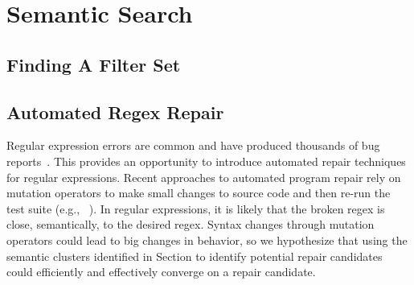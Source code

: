 \section{Semantic Search}

\subsection{Finding A Filter Set}

\subsection{Automated Regex Repair}
Regular expression errors are common and have produced thousands of bug reports~\cite{Spishak:2012:TSR:2318202.2318207}. This provides an opportunity to introduce automated repair techniques for regular expressions.
Recent approaches to automated program repair rely on mutation operators to make small changes to source code and then re-run the test suite (e.g., ~\cite{cacm10, genprog-tse-journal}). In regular expressions, it is likely that the broken regex is close, semantically, to the desired regex. Syntax changes through mutation operators could lead to big changes in behavior, so we hypothesize that using the semantic clusters identified in Section to identify potential repair candidates could efficiently and effectively converge on a repair candidate.
